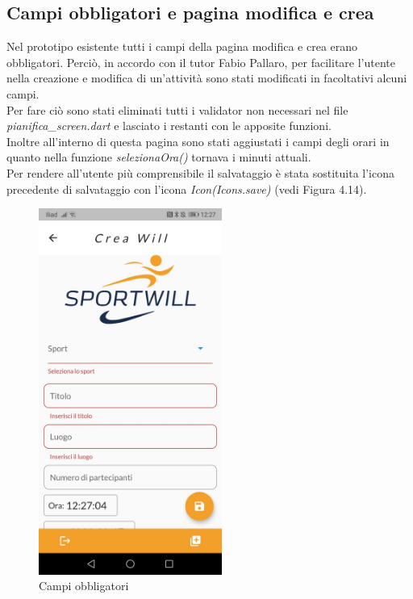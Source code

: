 \newpage

\subsection{Campi obbligatori e pagina modifica e crea}
Nel prototipo esistente tutti i campi della pagina modifica e crea erano obbligatori. Perciò, in accordo con il tutor Fabio Pallaro, per facilitare l'utente nella creazione e modifica di un'attività sono stati modificati in facoltativi alcuni campi.\\
Per fare ciò sono stati eliminati tutti i validator non necessari nel file \textit{pianifica\_screen.dart} e lasciato i restanti con le apposite funzioni.\\
Inoltre all'interno di questa pagina sono stati aggiustati i campi degli orari in quanto nella funzione \textit{selezionaOra()} tornava i minuti attuali.\\
Per rendere all'utente più comprensibile il salvataggio è stata sostituita l'icona precedente di salvataggio con l'icona \textit{Icon(Icons.save)} (vedi Figura 4.14).\\

\begin{figure}[htbp]	
	\centering
	\includegraphics[width=6cm]{immagini/modifica.jpeg}
	\caption{Campi obbligatori}
	\label{fig:Campi obbligatori}
\end{figure}

\newpage

